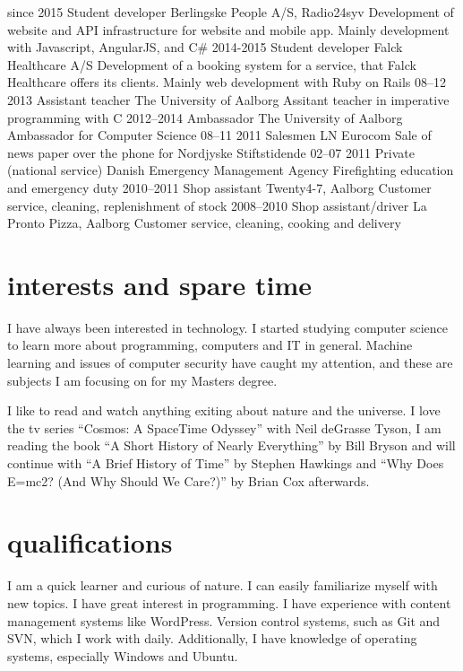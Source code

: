 \documentclass[]{friggeri-cv}
\begin{document}
\begin{entrylist}
  \entry
    {since 2015}
    {Student developer}
    {Berlingske People A/S, Radio24syv}
    {Development of website and API infrastructure for website and mobile app. Mainly development with Javascript, AngularJS, and C\#}
  \entry
    {2014-2015}
    {Student developer}
    {Falck Healthcare A/S}
    {Development of a booking system for a service, that Falck Healthcare offers its clients. Mainly web development with Ruby on Rails}
  \entry
    {08–12 2013}
    {Assistant teacher}
    {The University of Aalborg}
    {Assitant teacher in imperative programming with C}
  \entry
    {2012–2014}
    {Ambassador}
    {The University of Aalborg}
    {Ambassador for Computer Science}
  \entry
    {08–11 2011}
    {Salesmen}
    {LN Eurocom}
    {Sale of news paper over the phone for Nordjyske Stiftstidende}
  \entry
    {02–07 2011}
    {Private (national service)}
    {Danish Emergency Management Agency}
    {Firefighting education and emergency duty}
  \entry
    {2010–2011}
    {Shop assistant}
    {Twenty4-7, Aalborg}
    {Customer service, cleaning, replenishment of stock}
  \entry
    {2008–2010}
    {Shop assistant/driver}
    {La Pronto Pizza, Aalborg}
    {Customer service, cleaning, cooking and delivery}
\end{entrylist}

\section{interests and spare time}
I have always been interested in technology. I started studying computer science to learn more about programming, computers and IT in general. Machine learning and issues of computer security have caught my attention, and these are subjects I am focusing on for my Masters degree.

I like to read and watch anything exiting about nature and the universe. I love the tv series ``Cosmos: A SpaceTime Odyssey'' with Neil deGrasse Tyson, I am reading the book ``A Short History of Nearly Everything'' by Bill Bryson and will continue with ``A Brief History of Time'' by Stephen Hawkings and ``Why Does E=mc2? (And Why Should We Care?)'' by Brian Cox afterwards.

\section{qualifications}

I am a quick learner and curious of nature. I can easily familiarize myself with new topics. I have great interest in programming. I have experience with content management systems like WordPress. Version control systems, such as Git and SVN, which I work with daily. Additionally, I have knowledge of operating systems, especially Windows and Ubuntu.
\end{document}
